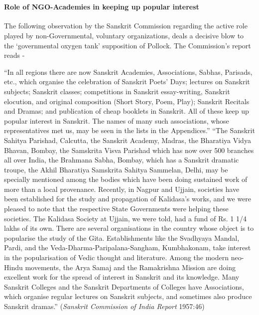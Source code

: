 ~\\[-40pt]

\paragraph{Role of NGO-Academies in keeping up popular interest}

The following observation by the Sanskrit Commission regarding the active role played by non-Governmental, voluntary organizations, deals a decisive blow to the ‘governmental oxygen tank’ supposition of Pollock. The Commission’s report reads  -  

\begin{myquote}
\eleven
“In all regions there are now Sanskrit Academies, Associations, Sabhas, Parisads, etc., which organise the celebration of Sanskrit Poets' Days; lectures on Sanskrit subjects; Sanskrit classes; competitions in Sanskrit essay-writing, Sanskrit elocution, and original composition (Short Story, Poem, Play); Sanskrit Recitals and Dramas; and publication of cheap booklets in Sanskrit. All of these keep up popular interest in Sanskrit. The names of many such associations, whose representatives met us, may be seen in the lists in the Appendices.” 
“The Sanskrit Sahitya Parishad, Calcutta, the Sanskrit Academy, Madras, the Bharatiya Vidya Bhavan, Bombay, the Samskrita Visva Parishad which has now over 500 branches all over India, the Brahmana Sabha, Bombay, which has a Sanskrit dramatic troupe, the Akhil Bharatiya Samskrita Sahitya Sammelan, Delhi, may be specially mentioned among the bodies which have been doing sustained work of more than a local provenance. Recently, in Nagpur and Ujjain, societies have been established for the study and propagation of Kalidasa's works, and we were pleased to note that the respective State Governments were helping these societies. The Kalidasa Society at Ujjain, we were told, had a fund of Rs. 1 1/4 lakhs of its own. There are several organisations in the country whose object is to popularise the study of the Gita. Establishments like the Svadhyaya Mandal, Pardi, and the Veda-Dharma-Paripalana-Sangham, Kumbhakonam, take interest in the popularisation of Vedic thought and literature. Among the modern neo-Hindu movements, the Arya Samaj and the Ramakrishna Mission are doing excellent work for the spread of interest in Sanskrit and its knowledge. Many Sanskrit Colleges and the Sanskrit Departments of Colleges have Associations, which organise regular lectures on Sanskrit subjects, and sometimes also produce Sanskrit dramas.” \hfill({\sl Sanskrit Commission of India Report} 1957:46)
\end{myquote}

